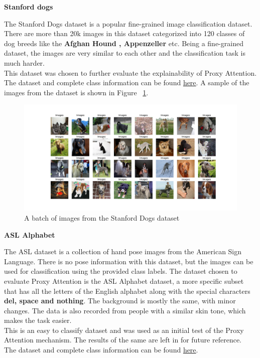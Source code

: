 \textbf{Stanford dogs}

The Stanford Dogs dataset \cite{khoslaNovelDatasetFineGrained} is a popular fine-grained image classification dataset. There are more than 20k images in this dataset categorized into  120 classes of dog breeds like the \textbf{Afghan Hound , Appenzeller} etc. Being a fine-grained dataset, the images are very similar to each other and the classification task is much harder.\\
This dataset was chosen to further evaluate the explainability of Proxy Attention.\\
The dataset and complete class information can be found \href{http://vision.stanford.edu/aditya86/ImageNetDogs/}{here}.
A sample of the images from the dataset is shown in Figure ~\ref{fig:dogs}.
\begin{figure}[!htb]
    \centering
    \includegraphics[width=1\textwidth]{images/dogs.pdf}
    \caption{A batch of images from the Stanford Dogs dataset}
    \label{fig:dogs}
\end{figure}

\textbf{ASL Alphabet}

The ASL dataset is a collection of hand pose images from the American Sign Language. There is no pose information with this dataset, but the images can be used for classification using the provided class labels.
The dataset chosen to evaluate Proxy Attention is the ASL Alphabet dataset, a more specific subset that has all the letters of the English alphabet along with the special characters \textbf{del, space and nothing}. The background is mostly the same, with minor changes. The data is also recorded from people with a similar skin tone, which makes the task easier.\\
This is an easy to classify dataset and was used as an initial test of the Proxy Attention mechanism. The results of the same are left in for future reference. \\
The dataset and complete class information can be found \href{https://www.kaggle.com/datasets/grassknoted/asl-alphabet}{here}.

